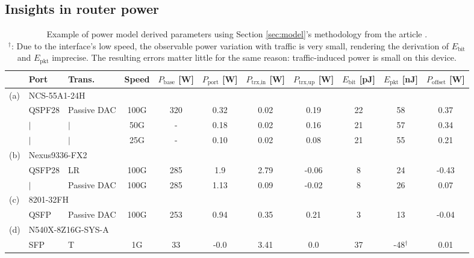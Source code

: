 \subsection{Insights in router power}\label{sec:insight} 
\begin{table}[ht]
    \small
	\caption{Example of power model derived parameters using Section \ref{sec:model}'s methodology from the article \cite{FantasticJoul}.\\
		\scriptsize
		$^{\dagger}$: Due to the interface’s low speed, the observable power variation with traffic is very small, rendering the derivation of $E_\text{bit}$ and $E_\text{pkt}$ imprecise.
The resulting errors matter little for the same reason: traffic-induced power is small on this device. }\label{tab:params}

    \centering
    \begin{tabular}{lllcccccccc}
        \toprule
        & Port & Trans. & Speed & $P_{\text{base}}$ [W] & $P_{\text{port}}$ [W] & $P_{\text{trx,in}}$ [W] & $P_{\text{trx,up}}$ [W] & $E_{\text{bit}}$ [pJ] & $E_{\text{pkt}}$ [nJ] & $P_{\text{offset}}$ [W] \\
        \midrule
        (a) & \multicolumn{10}{l}{NCS-55A1-24H} \\
            & QSPF28 & Passive DAC & 100G & 320 & 0.32 & 0.02 & 0.19 & 22 & 58 & 0.37 \\
            & $|$    & $|$         & 50G  & -   & 0.18 & 0.02 & 0.16 & 21 & 57 & 0.34 \\
            & $|$    & $|$         & 25G  & -   & 0.10 & 0.02 & 0.08 & 21 & 55 & 0.21 \\
        \midrule
        (b) & \multicolumn{10}{l}{Nexus9336-FX2} \\
            & QSFP28 & LR          & 100G & 285 & 1.9  & 2.79 & -0.06 & 8  & 24 & -0.43 \\
            & $|$    & Passive DAC & 100G & 285 & 1.13 & 0.09 & -0.02 & 8  & 26 & 0.07  \\
        \midrule
        (c) & \multicolumn{10}{l}{8201-32FH} \\
            & QSFP   & Passive DAC & 100G & 253 & 0.94 & 0.35 & 0.21  & 3  & 13 & -0.04 \\
        \midrule
        (d) & \multicolumn{10}{l}{N540X-8Z16G-SYS-A} \\
            & SFP    & T           & 1G   & 33  & -0.0 & 3.41 & 0.0   & 37 & -48$^{\dagger}$ & 0.01 \\
        \bottomrule
    \end{tabular}
\end{table}

